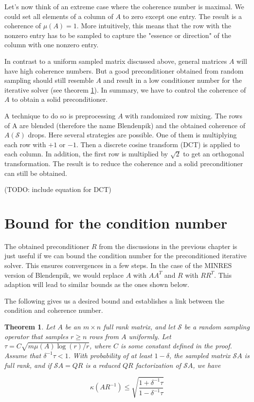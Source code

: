\documentclass{article}
\newtheorem{theorem}{Theorem}
\begin{document}
\bigskip

Let's now think of an extreme case where the coherence number is maximal. We
could set all elements of a column of $A$ to zero except one entry. The
result is a coherence of $\mu(A)=1$. More intuitively, this means that the row with
the nonzero entry has to be sampled to capture the "essence or direction" of
the column with one nonzero entry.

In contrast to a uniform sampled matrix discussed above, general matrices $A$
will have high coherence numbers. But a good preconditioner obtained from
random sampling should still resemble $A$ and result in a low conditioner
number for the iterative solver (see theorem \ref{thm_1}). In summary, we have
to control the coherence of $A$ to obtain a solid preconditioner.

A technique to do so is preprocessing $A$ with randomized row mixing. The rows
of A are blended (therefore the name Blendenpik) and the obtained coherence of
$A(\mathcal{S})$ drops. Here several strategies are possible. One of them is
multiplying each row with $+1$ or $-1$. Then a discrete cosine transform (DCT)
is applied to each column. In addition, the first row is multiplied by
$\sqrt{2}$ to get an orthogonal transformation. The result is to reduce the
coherence and a solid preconditioner can still be obtained.

\bigskip
(TODO: include equation for DCT)
\bigskip

\section{Bound for the condition number} \label{bound}
The obtained preconditioner $R$ from the discussions in the previous chapter is
just useful if we can bound the condition number for the
preconditioned iterative solver. This ensures convergences in a few steps. In
the case of the MINRES version of Blendenpik, we would replace $A$ with $AA^T$
and $R$ with $RR^T$. This adaption will lead to similar bounds as the ones
shown below.

The following gives us a desired bound and establishes a link between the
condition and coherence number.

\begin{theorem} \label{thm_1}
Let $A$ be an $m \times n$ full rank matrix, and let $\mathcal{S}$ be a random
sampling operator that samples $r \geq n$ rows from $A$ uniformly. Let $\tau=C
\sqrt{m \mu(A) \log (r) / r}$, where $C$ is some constant defined in the proof.
Assume that $\delta^{-1} \tau<1$. With probability of at least $1-\delta$, the
sampled matrix $\mathcal{S} A$ is full rank, and if $\mathcal{S} A=Q R$ is a
reduced $Q R$ factorization of $\mathcal{S} A$, we have

\begin{equation} \label{equ_thm1}
\kappa\left(A R^{-1}\right) \leq \sqrt{\frac{1+\delta^{-1} \tau}{1-\delta^{-1} \tau}}
\end{equation}
\end{theorem}
\end{document}
